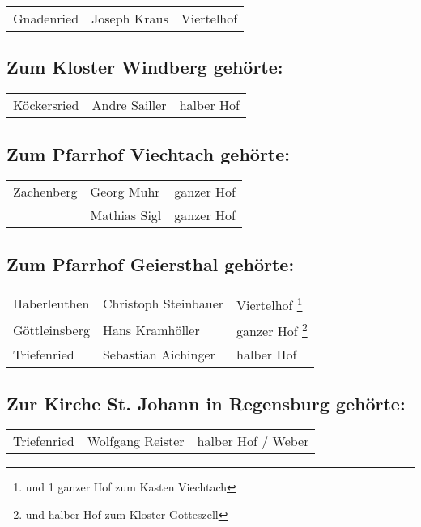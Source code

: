 \documentclass[12pt,a4pager,draft]{book}
\begin{document}
\begin{longtable}{l|l|l}
Gnadenried & Joseph Kraus & Viertelhof\\
\end{longtable}

\subsection{Zum Kloster Windberg gehörte:}

\begin{longtable}{l|l|l}
Köckersried & Andre Sailler & halber Hof\\
\end{longtable}

\subsection{Zum Pfarrhof Viechtach gehörte:}

\begin{longtable}{l|l|l}
Zachenberg & Georg Muhr & ganzer Hof\\
& Mathias Sigl & ganzer Hof\\
\end{longtable}

\subsection{Zum Pfarrhof Geiersthal gehörte:}

\begin{longtable}{l|l|l}
Haberleuthen & Christoph Steinbauer & Viertelhof \footnote{und 1 ganzer Hof zum
Kasten Viechtach}\\

Göttleinsberg & Hans Kramhöller & ganzer Hof \footnote{und halber Hof zum
Kloster Gotteszell}\\

Triefenried & Sebastian Aichinger & halber Hof\\
\end{longtable}

\subsection{Zur Kirche St. Johann in Regensburg gehörte:}

\begin{longtable}{l|l|l}
Triefenried & Wolfgang Reister & halber Hof / Weber\\
\end{longtable}
\end{document}
